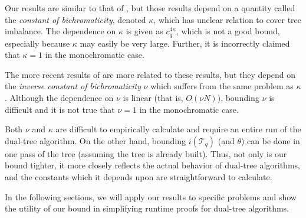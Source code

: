 Our results are similar to that of \citet{ram2009}, but those results depend on
a quantity called the {\it constant of bichromaticity}, denoted $\kappa$, which
has unclear relation to cover tree imbalance.  The dependence on $\kappa$ is
given as $c_q^{4 \kappa}$, which is not a good bound, especially because
$\kappa$ may easily be very large.  Further, it is incorrectly claimed that
$\kappa = 1$ in the monochromatic case.

The more recent results of \citet{curtin2014dual} are more related to these
results, but they depend on the {\it inverse constant of bichromaticity} $\nu$
which suffers from the same problem as $\kappa$.  Although the dependence on
$\nu$ is linear (that is, $O(\nu N)$), bounding $\nu$ is difficult and it is not
true that $\nu = 1$ in the monochromatic case.

Both $\nu$ and $\kappa$ are difficult to empirically calculate and require an
entire run of the dual-tree algorithm.  On the other hand, bounding
$i(\mathscr{T}_q)$ (and $\theta$) can be done in one pass of the tree (assuming
the tree is already built).  Thus, not only is our bound tighter, it more
closely reflects the actual behavior of dual-tree algorithms, and the constants
which it depends upon are straightforward to calculate.

In the following sections, we will apply our results to specific problems and
show the utility of our bound in simplifying runtime proofs for dual-tree
algorithms.




